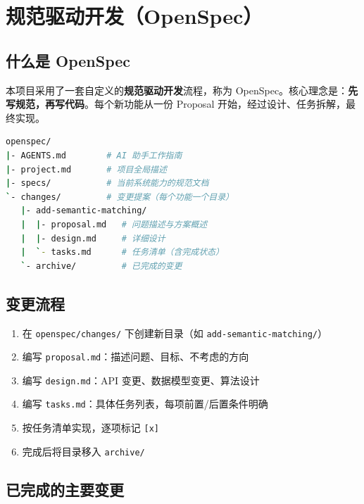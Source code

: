 \documentclass[11pt]{article}
\begin{document}
\section{规范驱动开发（OpenSpec）}

\subsection{什么是 OpenSpec}

本项目采用了一套自定义的\textbf{规范驱动开发}流程，称为 OpenSpec。核心理念是：\textbf{先写规范，再写代码}。每个新功能从一份 Proposal 开始，经过设计、任务拆解，最终实现。

\begin{lstlisting}[language=bash, caption=OpenSpec 目录结构]
openspec/
|- AGENTS.md        # AI 助手工作指南
|- project.md       # 项目全局描述
|- specs/           # 当前系统能力的规范文档
`- changes/         # 变更提案（每个功能一个目录）
   |- add-semantic-matching/
   |  |- proposal.md   # 问题描述与方案概述
   |  |- design.md     # 详细设计
   |  `- tasks.md      # 任务清单（含完成状态）
   `- archive/         # 已完成的变更
\end{lstlisting}

\subsection{变更流程}

\begin{enumerate}
    \item 在 \texttt{openspec/changes/} 下创建新目录（如 \texttt{add-semantic-matching/}）
    \item 编写 \texttt{proposal.md}：描述问题、目标、不考虑的方向
    \item 编写 \texttt{design.md}：API 变更、数据模型变更、算法设计
    \item 编写 \texttt{tasks.md}：具体任务列表，每项前置/后置条件明确
    \item 按任务清单实现，逐项标记 \texttt{[x]}
    \item 完成后将目录移入 \texttt{archive/}
\end{enumerate}

\subsection{已完成的主要变更}
\end{document}
